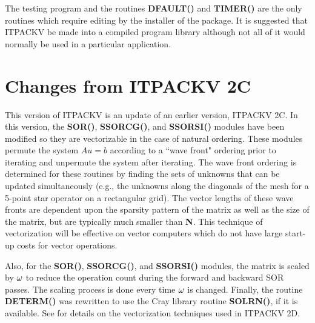 The testing program and the routines {\bf DFAULT()} and {\bf TIMER()} 
are the only routines which require editing by the installer of the
package.  It is suggested that ITPACKV be made into a compiled program
library although not all of it would normally be used in a particular
application.
 
\section{Changes from ITPACKV 2C}
 
This version of ITPACKV is an update of an earlier version, ITPACKV 2C.  
In this version, the {\bf SOR()}, {\bf SSORCG()}, and {\bf SSORSI()} 
modules have been modified so they are vectorizable in the 
case of natural ordering.  These modules permute the system $Au=b$ 
according to a ``wave front" ordering prior to iterating and unpermute the 
system after iterating.  The wave front ordering is determined for these 
routines by finding the sets of unknowns that can be updated 
simultaneously (e.g., the unknowns along the diagonals of the mesh for 
a 5-point star operator on a rectangular grid).  The vector lengths of 
these wave fronts are dependent upon the sparsity pattern of the matrix 
as well as the size of the matrix, but are typically much smaller than 
{\bf N}.  This technique of vectorization will be effective on vector 
computers which do not have large start-up costs for vector operations.  

Also, for the {\bf SOR()}, {\bf SSORCG()}, and {\bf SSORSI()} modules, 
the matrix is scaled by $\omega$ to reduce the operation count during the
forward and backward SOR passes.  The scaling process is done every time
$\omega$ is changed.  Finally, the routine {\bf DETERM()} was rewritten to 
use the Cray library routine {\bf SOLRN()}, if it is available. See
\cite{11} for details on the vectorization techniques used in ITPACKV 2D.

